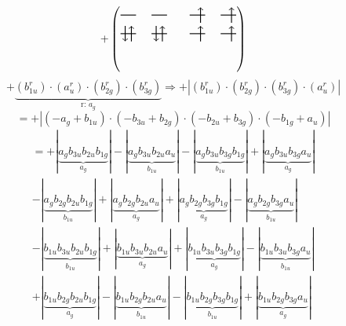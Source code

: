 \documentclass{article}
\begin{document}
\[+\left(\begin{tikzpicture}
    \draw[thick] (0,0) -- (0.5,0); %
    \draw[thick] (1,0) -- (1.5,0); %
    \draw[thick] (0,-0.6) -- (0.5,-0.6); %
    \draw[thick] (1,-0.6) -- (1.5,-0.6); %
\draw[-> , thick] (0.35, -0.85) -- (0.35, -0.35); 
\draw[<- , thick] (0.15, -0.85) -- (0.15, -0.35); 
 \draw[-> , thick] (1.35, -0.85) -- (1.35, -0.35); 
\draw[<- , thick] (1.15, -0.85) -- (1.15, -0.35); 
\end{tikzpicture}\qquad \begin{tikzpicture}
    \draw[thick] (0,0) -- (0.5,0); %
    \draw[thick] (1,0) -- (1.5,0); %
    \draw[thick] (0,-0.6) -- (0.5,-0.6); %
    \draw[thick] (1,-0.6) -- (1.5,-0.6); %
\draw[->, thick] (0.35, -0.25) -- (0.35, 0.25); 
\draw[->, thick] (1.35, -0.25) -- (1.35, 0.25); 
\draw[-> , thick] (0.35, -0.85) -- (0.35, -0.35); 
 \draw[-> , thick] (1.35, -0.85) -- (1.35, -0.35); 
\end{tikzpicture}\right)\]$$+ \underbrace{(b_{1u}^{r})\cdot (a_{u}^{r})\cdot (b_{2g}^{r})\cdot (b_{3g}^{r})}_{\text{r: }a_{g}}\Rightarrow +\left|(b_{1u}^{r}) \cdot (b_{2g}^{r}) \cdot (b_{3g}^{r}) \cdot (a_{u}^{r})\right|$$$$=+\left|(-a_{g}+b_{1u}) \cdot (-b_{3u}+b_{2g}) \cdot (-b_{2u}+b_{3g}) \cdot (-b_{1g}+a_{u})\right|$$\begin{multline*}
=+\left|\underbrace{a_{g} b_{3u} b_{2u} b_{1g}}_{a_{g}}\right|-\left|\underbrace{a_{g} b_{3u} b_{2u} a_{u}}_{b_{1u}}\right|-\left|\underbrace{a_{g} b_{3u} b_{3g} b_{1g}}_{b_{1u}}\right|+\left|\underbrace{a_{g} b_{3u} b_{3g} a_{u}}_{a_{g}}\right|\\
-\left|\underbrace{a_{g} b_{2g} b_{2u} b_{1g}}_{b_{1u}}\right|+\left|\underbrace{a_{g} b_{2g} b_{2u} a_{u}}_{a_{g}}\right|+\left|\underbrace{a_{g} b_{2g} b_{3g} b_{1g}}_{a_{g}}\right|-\left|\underbrace{a_{g} b_{2g} b_{3g} a_{u}}_{b_{1u}}\right|\\
-\left|\underbrace{b_{1u} b_{3u} b_{2u} b_{1g}}_{b_{1u}}\right|+\left|\underbrace{b_{1u} b_{3u} b_{2u} a_{u}}_{a_{g}}\right|+\left|\underbrace{b_{1u} b_{3u} b_{3g} b_{1g}}_{a_{g}}\right|-\left|\underbrace{b_{1u} b_{3u} b_{3g} a_{u}}_{b_{1u}}\right|\\
+\left|\underbrace{b_{1u} b_{2g} b_{2u} b_{1g}}_{a_{g}}\right|-\left|\underbrace{b_{1u} b_{2g} b_{2u} a_{u}}_{b_{1u}}\right|-\left|\underbrace{b_{1u} b_{2g} b_{3g} b_{1g}}_{b_{1u}}\right|+\left|\underbrace{b_{1u} b_{2g} b_{3g} a_{u}}_{a_{g}}\right|

\end{multline*}
\end{document}
